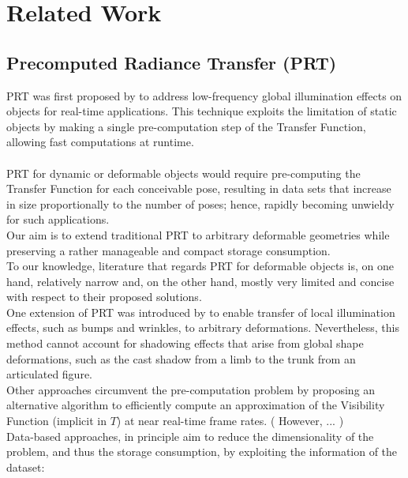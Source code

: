 \section{Related Work}
\subsection*{Precomputed Radiance Transfer (PRT)}
PRT was first proposed by \cite{sloan2002precomputed} to address low-frequency global illumination effects on objects for real-time applications. This technique exploits the limitation of static objects by making a single pre-computation step of the Transfer Function, allowing fast computations at runtime. \\
\\
PRT for dynamic or deformable objects would require pre-computing the Transfer Function for each conceivable pose, resulting in data sets that increase in size proportionally to the number of poses; hence, rapidly becoming unwieldy for such applications.\\
Our aim is to extend traditional PRT to arbitrary deformable geometries while preserving a rather manageable and compact storage consumption. \\
To our knowledge, literature that regards PRT for deformable objects is, on one hand, relatively narrow and, on the other hand, mostly very limited and concise with respect to their proposed solutions. \\
One extension of PRT was introduced by  \cite{local-deformable-precomputed-radiance-transfer} to enable transfer of local illumination effects, such as bumps and wrinkles, to arbitrary deformations.  Nevertheless, this method cannot account for shadowing effects that arise from global shape deformations, such as the cast shadow from a limb to the trunk from an articulated figure.\\
Other approaches \cite{Implicit_Visibility, Implicit_Visibility_2} circumvent the pre-computation problem by proposing an alternative algorithm to efficiently compute an approximation of the Visibility Function (implicit in $T$) at near real-time frame rates. ( However, ... )\\
Data-based approaches, in principle aim to reduce the dimensionality of the problem, and thus the storage consumption, by exploiting the information of the dataset:\\
